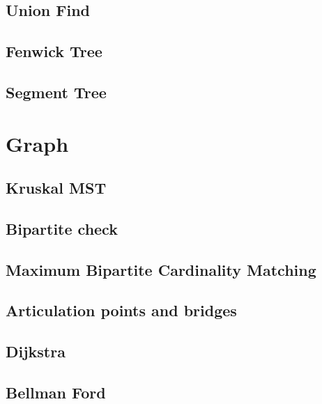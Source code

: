 \documentclass[a4paper,landscape,8pt]{article}
\begin{document}
\begin{multicols}{2}
\subsection{Union Find}


\subsection{Fenwick Tree}


\subsection{Segment Tree}



\section{Graph}

\subsection{Kruskal MST}


\subsection{Bipartite check}


\subsection{Maximum Bipartite Cardinality Matching}


\subsection{Articulation points and bridges}


\subsection{Dijkstra}


\subsection{Bellman Ford}



\end{multicols}
\end{document}

